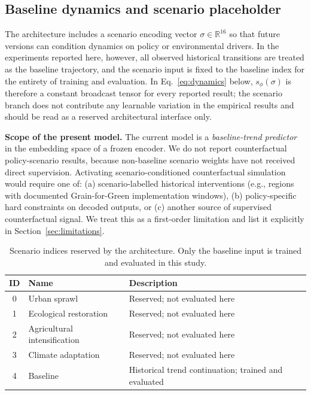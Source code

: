 \documentclass{article}
\begin{document}
\subsection{Baseline dynamics and scenario placeholder}
\label{sec:limitations_scenario}

The architecture includes a scenario encoding vector $\sigma \in \mathbb{R}^{16}$ so that future versions can condition dynamics on policy or environmental drivers. In the experiments reported here, however, all observed historical transitions are treated as the baseline trajectory, and the scenario input is fixed to the baseline index for the entirety of training and evaluation. In Eq.~\ref{eq:dynamics} below, $s_\phi(\sigma)$ is therefore a constant broadcast tensor for every reported result; the scenario branch does not contribute any learnable variation in the empirical results and should be read as a reserved architectural interface only.

\textbf{Scope of the present model.} The current model is a \textit{baseline-trend predictor} in the embedding space of a frozen encoder. We do not report counterfactual policy-scenario results, because non-baseline scenario weights have not received direct supervision. Activating scenario-conditioned counterfactual simulation would require one of: (a) scenario-labelled historical interventions (e.g., regions with documented Grain-for-Green implementation windows), (b) policy-specific hard constraints on decoded outputs, or (c) another source of supervised counterfactual signal. We treat this as a first-order limitation and list it explicitly in Section~\ref{sec:limitations}.

\begin{table}[htbp]
\centering
\caption{Scenario indices reserved by the architecture. Only the baseline input is trained and evaluated in this study.}
\label{tab:scenarios}
\small
\begin{tabular}{clp{}}
\toprule
ID & Name & Description \\
\midrule
0 & Urban sprawl & Reserved; not evaluated here \\
1 & Ecological restoration & Reserved; not evaluated here \\
2 & Agricultural intensification & Reserved; not evaluated here \\
3 & Climate adaptation & Reserved; not evaluated here \\
4 & Baseline & Historical trend continuation; trained and evaluated \\
\bottomrule
\end{tabular}
\end{table}
\end{document}
